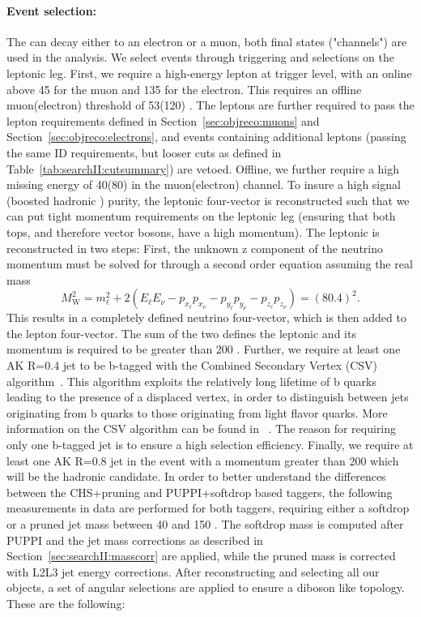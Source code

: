 \paragraph{Event selection:}
The \PW can decay either to an electron or a muon, both final states ("channels") are used in the analysis. We select events through triggering and selections on the leptonic leg. First, we require a high-energy lepton at trigger level, with an online \PT above 45 \GeV for the muon and 135 \GeV for the electron. This requires an offline muon(electron) \PT threshold of 53(120) \GeV. The leptons are further required to pass the lepton requirements defined in Section~\ref{sec:objreco:muons} and Section~\ref{sec:objreco:electrons}, and events containing additional leptons (passing the same ID requirements, but looser cuts as defined in Table~\ref{tab:searchII:cutsummary}) are vetoed. Offline, we further require a high missing energy of 40(80) \GeV in the muon(electron) channel. To insure a high signal (boosted hadronic \PW) purity, the leptonic \PW four-vector is reconstructed such that we can put tight momentum requirements on the leptonic leg (ensuring that both tops, and therefore vector bosons, have a high momentum). The leptonic \PW is reconstructed in two steps: First, the unknown z component of the neutrino momentum must be solved for through a second order equation assuming the real \PW mass
\begin{equation*}
M_\mathrm{W}^2 = m_\ell^2   + 2(E_\ell E_\nu - p_{x_\ell}p_{x_\nu} - p_{y_\ell}p_{y_\nu} - p_{z_\ell}p_{z_\nu} ) = (80.4)^2.  
\end{equation*}
This results in a completely defined neutrino four-vector, which is then added to the lepton four-vector. The sum of the two defines the leptonic \PW and its momentum is required to be greater than 200 \GeV. \newline
Further, we require at least one AK R=0.4 jet to be b-tagged with the Combined Secondary Vertex (CSV) algorithm~\cite{1748-0221-8-04-P04013,1748-0221-13-05-P05011}. This algorithm exploits the relatively long lifetime of b quarks leading to the presence of a displaced vertex, in order to distinguish between jets originating from b quarks to those originating from light flavor quarks. More information on the CSV algorithm can be found in ~\cite{1748-0221-8-04-P04013,1748-0221-13-05-P05011}. The reason for requiring only one b-tagged jet is to ensure a high selection efficiency.\newline
Finally, we require at least one AK R=0.8 jet in the event with a momentum greater than 200 \GeV which will be the hadronic \PW candidate. In order to better understand the differences between the CHS+pruning and PUPPI+softdrop based taggers, the following measurements in data are performed for both taggers, requiring either a softdrop or a pruned jet mass between 40 \GeV and 150 \GeV. The softdrop mass is computed after PUPPI and the jet mass corrections as described in Section~\ref{sec:searchII:masscorr} are applied, while the pruned mass is corrected with L2L3 jet energy corrections. After reconstructing and selecting all our objects, a set of angular selections are applied to ensure a diboson like topology. These are the following:
